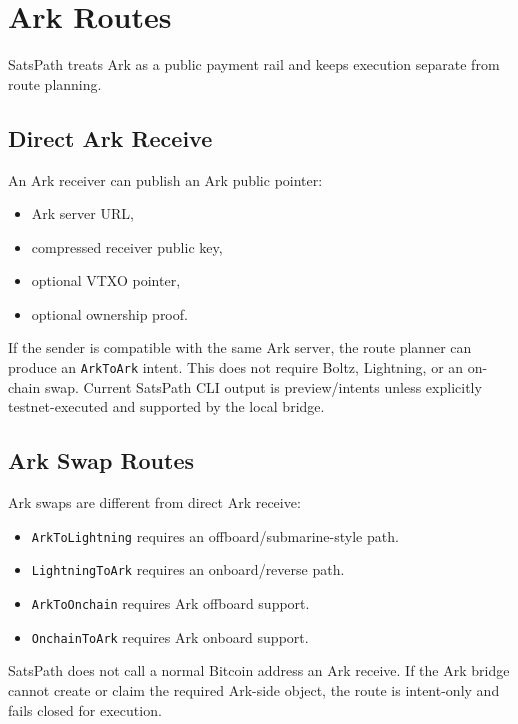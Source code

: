 \documentclass[
]{article}
\author{}
\date{}
\providecommand{\tightlist}{%
  \setlength{\itemsep}{0pt}\setlength{\parskip}{0pt}}
\begin{document}
\hypertarget{ark-routes}{%
\section{Ark Routes}\label{ark-routes}}

SatsPath treats Ark as a public payment rail and keeps execution
separate from route planning.

\hypertarget{direct-ark-receive}{%
\subsection{Direct Ark Receive}\label{direct-ark-receive}}

An Ark receiver can publish an Ark public pointer:

\begin{itemize}
\tightlist
\item
  Ark server URL,
\item
  compressed receiver public key,
\item
  optional VTXO pointer,
\item
  optional ownership proof.
\end{itemize}

If the sender is compatible with the same Ark server, the route planner
can produce an \texttt{ArkToArk} intent. This does not require Boltz,
Lightning, or an on-chain swap. Current SatsPath CLI output is
preview/intents unless explicitly testnet-executed and supported by the
local bridge.

\hypertarget{ark-swap-routes}{%
\subsection{Ark Swap Routes}\label{ark-swap-routes}}

Ark swaps are different from direct Ark receive:

\begin{itemize}
\tightlist
\item
  \texttt{ArkToLightning} requires an offboard/submarine-style path.
\item
  \texttt{LightningToArk} requires an onboard/reverse path.
\item
  \texttt{ArkToOnchain} requires Ark offboard support.
\item
  \texttt{OnchainToArk} requires Ark onboard support.
\end{itemize}

SatsPath does not call a normal Bitcoin address an Ark receive. If the
Ark bridge cannot create or claim the required Ark-side object, the
route is intent-only and fails closed for execution.
\end{document}
